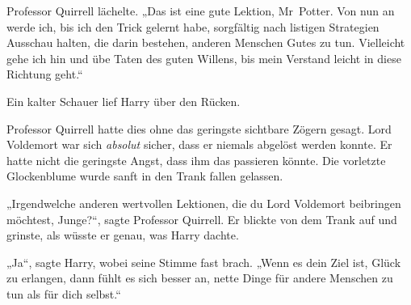 Professor Quirrell lächelte.
„Das ist eine gute Lektion, Mr~Potter. Von nun an werde ich, bis ich den Trick gelernt habe, sorgfältig nach listigen Strategien Ausschau halten, die darin bestehen, anderen Menschen Gutes zu tun. Vielleicht gehe ich hin und übe Taten des guten Willens, bis mein Verstand leicht in diese Richtung geht.“

Ein kalter Schauer lief Harry über den Rücken.

Professor Quirrell hatte dies ohne das geringste sichtbare Zögern gesagt.
Lord Voldemort war sich \emph{absolut} sicher, dass er niemals abgelöst werden konnte. Er hatte nicht die geringste Angst, dass ihm das passieren könnte.
Die vorletzte Glockenblume wurde sanft in den Trank fallen gelassen.

„Irgendwelche anderen wertvollen Lektionen, die du Lord Voldemort beibringen möchtest, Junge?“, sagte Professor Quirrell. Er blickte von dem Trank auf und grinste, als wüsste er genau, was Harry dachte.

„Ja“, sagte Harry, wobei seine Stimme fast brach. „Wenn es dein Ziel ist, Glück zu erlangen, dann fühlt es sich besser an, nette Dinge für andere Menschen zu tun als für dich selbst.“


